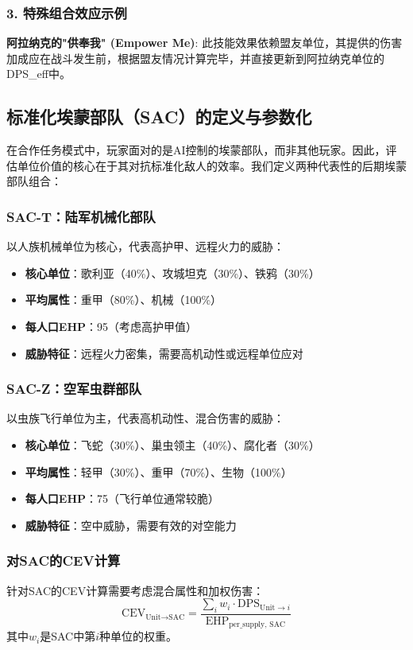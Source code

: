 \documentclass[a4paper,12pt]{article}
\begin{document}
\subsubsection{3. 特殊组合效应示例}
\textbf{阿拉纳克的"供奉我" (Empower Me)}: 此技能效果依赖盟友单位，其提供的伤害加成应在战斗发生前，根据盟友情况计算完毕，并直接更新到阿拉纳克单位的DPS\_eff中。

\subsection{标准化埃蒙部队（SAC）的定义与参数化}

在合作任务模式中，玩家面对的是AI控制的埃蒙部队，而非其他玩家。因此，评估单位价值的核心在于其对抗标准化敌人的效率。我们定义两种代表性的后期埃蒙部队组合：

\subsubsection{SAC-T：陆军机械化部队}
以人族机械单位为核心，代表高护甲、远程火力的威胁：
\begin{itemize}
\item \textbf{核心单位}：歌利亚（40\%）、攻城坦克（30\%）、铁鸦（30\%）
\item \textbf{平均属性}：重甲（80\%）、机械（100\%）
\item \textbf{每人口EHP}：95（考虑高护甲值）
\item \textbf{威胁特征}：远程火力密集，需要高机动性或远程单位应对
\end{itemize}

\subsubsection{SAC-Z：空军虫群部队}
以虫族飞行单位为主，代表高机动性、混合伤害的威胁：
\begin{itemize}
\item \textbf{核心单位}：飞蛇（30\%）、巢虫领主（40\%）、腐化者（30\%）
\item \textbf{平均属性}：轻甲（30\%）、重甲（70\%）、生物（100\%）
\item \textbf{每人口EHP}：75（飞行单位通常较脆）
\item \textbf{威胁特征}：空中威胁，需要有效的对空能力
\end{itemize}

\subsubsection{对SAC的CEV计算}
针对SAC的CEV计算需要考虑混合属性和加权伤害：
\begin{equation}
\text{CEV}_{\text{Unit} \rightarrow \text{SAC}} = \frac{\sum_{i} w_i \cdot \text{DPS}_{\text{Unit} \rightarrow i}}{\text{EHP}_{\text{per\_supply, SAC}}}
\end{equation}
其中$w_i$是SAC中第$i$种单位的权重。
\end{document}
